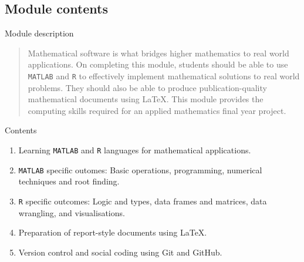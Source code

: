\documentclass[,aspectratio=169]{beamer}
\providecommand{\tightlist}{%
  \setlength{\itemsep}{0pt}\setlength{\parskip}{0pt}}
\begin{document}
\hypertarget{module-contents}{%
\subsection{Module contents}\label{module-contents}}

\begin{frame}[fragile]{Module description}
\protect\hypertarget{module-description}{}
\begin{quote}
Mathematical software is what bridges higher mathematics to real world
applications. On completing this module, students should be able to use
\texttt{MATLAB} and \texttt{R} to effectively implement mathematical
solutions to real world problems. They should also be able to produce
publication-quality mathematical documents using \LaTeX. This module
provides the computing skills required for an applied mathematics final
year project.
\end{quote}

\vspace{1em}

Contents

\begin{enumerate}
\tightlist
\item
  Learning \texttt{MATLAB} and \texttt{R} languages for mathematical
  applications.
\item
  \texttt{MATLAB} specific outomes: Basic operations, programming,
  numerical techniques and root finding.
\item
  \texttt{R} specific outcomes: Logic and types, data frames and
  matrices, data wrangling, and visualisations.
\item
  Preparation of report-style documents using \LaTeX.
\item
  Version control and social coding using Git and GitHub.
\end{enumerate}
\end{frame}
\end{document}
